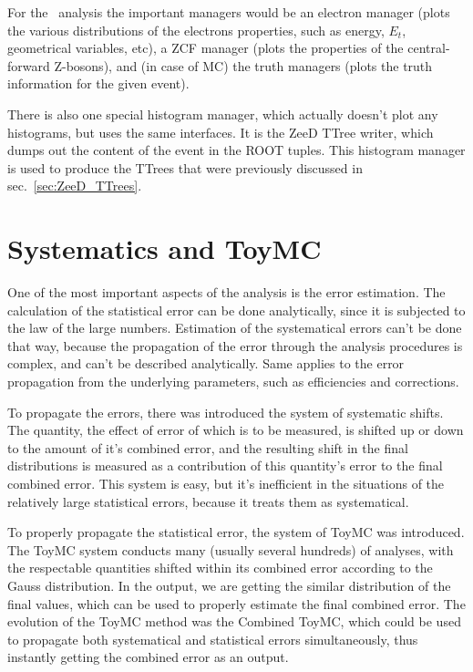 For the \Zee\ analysis the important managers would be an electron manager (plots the various distributions of the electrons properties, such as energy, $E_{t}$, geometrical variables, etc), a ZCF manager (plots the properties of the central-forward Z-bosons), and (in case of MC) the truth managers (plots the truth information for the given event).

There is also one special histogram manager, which actually doesn't plot any histograms, but uses the same interfaces. It is the ZeeD TTree writer, which dumps out the content of the event in the ROOT tuples. This histogram manager is used to produce the TTrees that were previously discussed in sec.~\ref{sec:ZeeD_TTrees}.

\section{Systematics and ToyMC}
\label{sec:ZeeD_toymc}

One of the most important aspects of the analysis is the error estimation. The calculation of the statistical error can be done analytically, since it is subjected to the law of the large numbers. Estimation of the systematical errors can't be done that way, because the propagation of the error through the analysis procedures is complex, and can't be described analytically. Same applies to the error propagation from the underlying parameters, such as efficiencies and corrections.

To propagate the errors, there was introduced the system of systematic shifts. The quantity, the effect of error of which is to be measured, is shifted up or down to the amount of it's combined error, and the resulting shift in the final distributions is measured as a contribution of this quantity's error to the final combined error. This system is easy, but it's inefficient in the situations of the relatively large statistical errors, because it treats them as systematical.

To properly propagate the statistical error, the system of ToyMC was introduced. The ToyMC system conducts many (usually several hundreds) of analyses, with the respectable quantities shifted within its combined error according to the Gauss distribution. In the output, we are getting the similar distribution of the final values, which can be used to properly estimate the final combined error. The evolution of the ToyMC method was the Combined ToyMC, which could be used to propagate both systematical and statistical errors simultaneously, thus instantly getting the combined error as an output.
